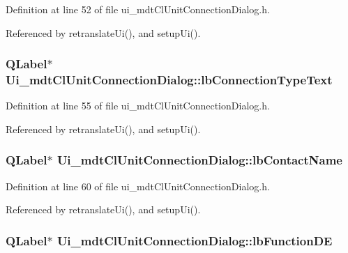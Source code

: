 Definition at line 52 of file ui\-\_\-mdt\-Cl\-Unit\-Connection\-Dialog.\-h.



Referenced by retranslate\-Ui(), and setup\-Ui().

\hypertarget{class_ui__mdt_cl_unit_connection_dialog_a4598e20b2e24d1eb51ab7d0b1923885d}{
\subsubsection[{lb\-Connection\-Type\-Text}]{\setlength{\rightskip}{0pt plus 5cm}Q\-Label$\ast$ Ui\-\_\-mdt\-Cl\-Unit\-Connection\-Dialog\-::lb\-Connection\-Type\-Text}}\label{class_ui__mdt_cl_unit_connection_dialog_a4598e20b2e24d1eb51ab7d0b1923885d}


Definition at line 55 of file ui\-\_\-mdt\-Cl\-Unit\-Connection\-Dialog.\-h.



Referenced by retranslate\-Ui(), and setup\-Ui().

\hypertarget{class_ui__mdt_cl_unit_connection_dialog_a20934d29e80c28ad87b0139a5fedf08e}{
\subsubsection[{lb\-Contact\-Name}]{\setlength{\rightskip}{0pt plus 5cm}Q\-Label$\ast$ Ui\-\_\-mdt\-Cl\-Unit\-Connection\-Dialog\-::lb\-Contact\-Name}}\label{class_ui__mdt_cl_unit_connection_dialog_a20934d29e80c28ad87b0139a5fedf08e}


Definition at line 60 of file ui\-\_\-mdt\-Cl\-Unit\-Connection\-Dialog.\-h.



Referenced by retranslate\-Ui(), and setup\-Ui().

\hypertarget{class_ui__mdt_cl_unit_connection_dialog_ac635af197d77508cc73d8135be9be1d8}{
\subsubsection[{lb\-Function\-D\-E}]{\setlength{\rightskip}{0pt plus 5cm}Q\-Label$\ast$ Ui\-\_\-mdt\-Cl\-Unit\-Connection\-Dialog\-::lb\-Function\-D\-E}}\label{class_ui__mdt_cl_unit_connection_dialog_ac635af197d77508cc73d8135be9be1d8}


